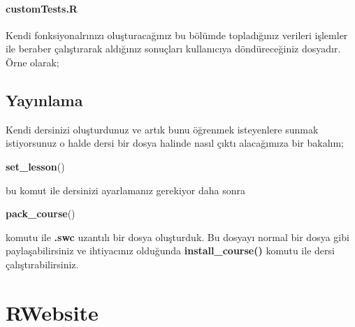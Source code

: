 \documentclass[]{book}
\newenvironment{Shaded}{\begin{snugshade}}{\end{snugshade}}
\newcommand{\KeywordTok}[1]{\textcolor[rgb]{0.13,0.29,0.53}{\textbf{#1}}}
\newcommand{\StringTok}[1]{\textcolor[rgb]{0.31,0.60,0.02}{#1}}
\newcommand{\CommentTok}[1]{\textcolor[rgb]{0.56,0.35,0.01}{\textit{#1}}}
\newcommand{\ControlFlowTok}[1]{\textcolor[rgb]{0.13,0.29,0.53}{\textbf{#1}}}
\newcommand{\OperatorTok}[1]{\textcolor[rgb]{0.81,0.36,0.00}{\textbf{#1}}}
\newcommand{\NormalTok}[1]{#1}
\begin{document}
\subsubsection{customTests.R}\label{customtests.r}

Kendi fonksiyonalrınızı oluşturacağınız bu bölümde topladığınız verileri
işlemler ile beraber çalıştırarak aldığınız sonuçları kullanıcıya
döndüreceğiniz dosyadır. Örne olarak;

\begin{Shaded}
\end{Shaded}

\section{Yayınlama}\label{yaynlama-1}

Kendi dersinizi oluşturdunuz ve artık bunu öğrenmek isteyenlere sunmak
istiyorsunuz o halde dersi bir dosya halinde nasıl çıktı alacağımıza bir
bakalım;

\begin{Shaded}
\begin{Highlighting}[]
\KeywordTok{set_lesson}\NormalTok{()}
\end{Highlighting}
\end{Shaded}

bu komut ile dersinizi ayarlamanız gerekiyor daha sonra

\begin{Shaded}
\begin{Highlighting}[]
\KeywordTok{pack_course}\NormalTok{()}
\end{Highlighting}
\end{Shaded}

komutu ile \textbf{.swc} uzantılı bir dosya oluşturduk. Bu dosyayı
normal bir dosya gibi paylaşabilirsiniz ve ihtiyacınız olduğunda
\textbf{install\_course()} komutu ile dersi çalıştırabilirsiniz.

\chapter{RWebsite}\label{rwebsite}
\end{document}
